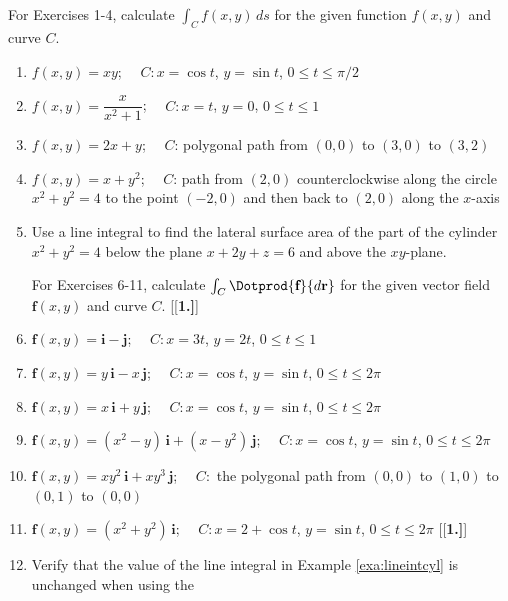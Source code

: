 \section*{}\begin{multicols}{2}\columnseprule 1pt \columnsep 25pt
\par\noindent For Exercises 1-4, calculate $\int_C f(x,y)\,ds$ for the given function $f(x,y)$ and
curve $C$.
\begin{enumerate}[\bfseries 1.]
 \item $f(x,y)=xy$; $\quad C: x=\cos t$, $y=\sin t$, $0 \le t \le \pi/2$
 \item $f(x,y)=\dfrac{x}{x^2 + 1}$; $\quad C: x=t$, $y=0$, $0 \le t \le 1$
 \item $f(x,y)=2x+y$; $\quad C$: polygonal path from $(0,0)$ to $(3,0)$ to $(3,2)$
 \item $f(x,y)=x+y^2$; $\quad C$: path from $(2,0)$ counterclockwise along the circle $x^2 + y^2 = 4$ to the point
  $(-2,0)$ and then back to $(2,0)$ along the $x$-axis
 \item Use a line integral to find the lateral surface area of the part of the cylinder\\$x^2 + y^2 = 4$ below
 the plane $x+2y+z=6$ and above the $xy$-plane.
\par\noindent For Exercises 6-11, calculate $\int_C \Dotprod{\textbf{f}}{d\textbf{r}}$ for the given vector
 field $\textbf{f}(x,y)$ and curve $C$.
[{[\bfseries 1.]}]
 \item $\textbf{f}(x,y) = \textbf{i} - \textbf{j}$; $\quad C: x=3t$, $y=2t$, $0 \le t \le 1$
 \item $\textbf{f}(x,y) = y\,\textbf{i} - x\,\textbf{j}$; $\quad C: x=\cos t$, $y=\sin t$, $0 \le t \le 2\pi$
 \item $\textbf{f}(x,y) = x\,\textbf{i} + y\,\textbf{j}$; $\quad C: x=\cos t$, $ y=\sin t$, $0 \le t \le 2\pi$
 \item $\textbf{f}(x,y) = (x^2 - y)\,\textbf{i} + (x-y^2 )\,\textbf{j}$; $\quad C: x=\cos t$, $y=\sin t$,
  $0 \le t \le 2\pi$
 \item $\textbf{f}(x,y) = xy^2 \,\textbf{i} + xy^3 \,\textbf{j}$; $\quad C:$ the polygonal path from $(0,0)$ to $(1,0)$
 to $(0,1)$ to $(0,0)$
 \item $\textbf{f}(x,y) =(x^2 + y^2 )\,\textbf{i}$; $\quad C: x=2+\cos t$, $y=\sin t$, $0 \le t \le 2\pi$
[{[\bfseries 1.]}]
 \item Verify that the value of the line integral in Example \ref{exa:lineintcyl} is unchanged when using the

\end{enumerate}
\end{multicols}
